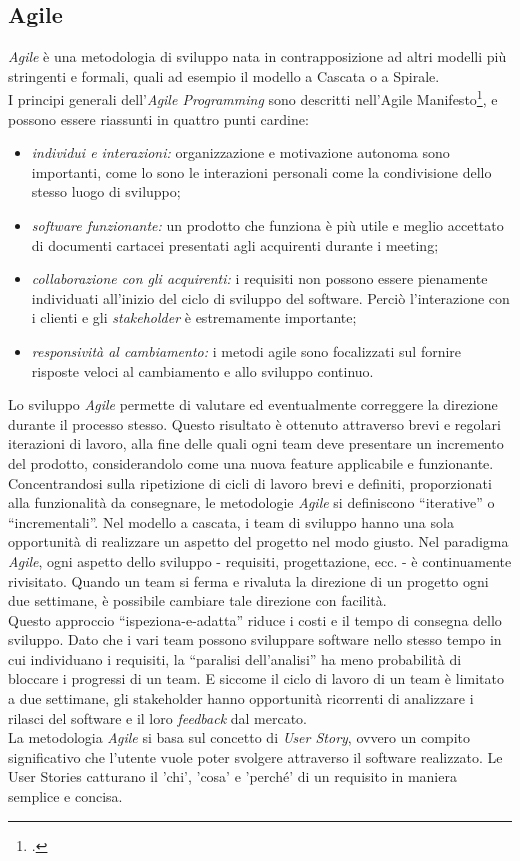 \subsection{Agile}
\emph{Agile} è una metodologia di sviluppo nata in contrapposizione ad altri modelli più stringenti e formali, quali ad esempio il modello a Cascata o a Spirale.\\
I principi generali dell’\emph{Agile Programming} sono descritti nell’Agile Manifesto\footcite{site:agile-manifesto}, e possono essere riassunti in quattro punti cardine:
\begin{itemize}
	\item \emph{individui e interazioni:} organizzazione e motivazione autonoma sono importanti, come lo sono le interazioni personali come la condivisione dello stesso luogo di sviluppo;
	\item \emph{software funzionante:} un prodotto che funziona è più utile e meglio accettato di documenti cartacei presentati agli acquirenti durante i meeting;
	\item \emph{collaborazione con gli acquirenti:} i requisiti non possono essere pienamente individuati all’inizio del ciclo di sviluppo del software. Perciò l’interazione con i clienti e gli \emph{stakeholder} è estremamente importante;
	\item \emph{responsività al cambiamento:} i metodi agile sono focalizzati sul fornire risposte veloci al cambiamento e allo sviluppo continuo.
\end{itemize}
Lo sviluppo \emph{Agile} permette di valutare ed eventualmente correggere la direzione durante il processo stesso. Questo risultato è ottenuto attraverso brevi e regolari iterazioni di lavoro, alla fine delle quali ogni team deve presentare un incremento del prodotto, considerandolo come una nuova feature applicabile e funzionante. Concentrandosi sulla ripetizione di cicli di lavoro brevi e definiti, proporzionati alla funzionalità da consegnare, le metodologie \emph{Agile} si definiscono “iterative” o “incrementali”. Nel modello a cascata, i team di sviluppo hanno una sola opportunità di realizzare un aspetto del progetto nel modo giusto. Nel paradigma \emph{Agile}, ogni aspetto dello sviluppo - requisiti, progettazione, ecc. - è continuamente rivisitato. Quando un team si ferma e rivaluta la direzione di un progetto ogni due settimane, è possibile cambiare tale direzione con facilità.\\
Questo approccio “ispeziona-e-adatta” riduce i costi e il tempo di consegna dello sviluppo. Dato che i vari team possono sviluppare software nello stesso tempo in cui individuano i requisiti, la “paralisi dell’analisi” ha meno probabilità di bloccare i progressi di un team. E siccome il ciclo di lavoro di un team è limitato a due settimane, gli stakeholder hanno opportunità ricorrenti di analizzare i rilasci del software e il loro \emph{feedback} dal mercato.\\
La metodologia \emph{Agile} si basa sul concetto di \emph{User Story}, ovvero un compito significativo che l'utente vuole poter svolgere attraverso il software realizzato. Le User Stories catturano il 'chi', 'cosa' e 'perché' di un requisito in maniera semplice e concisa.

